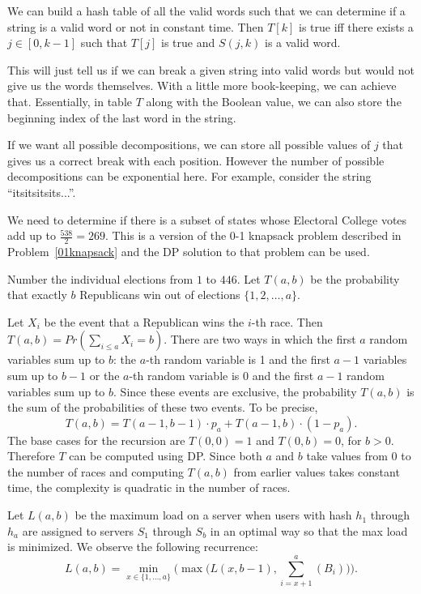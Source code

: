 We can build a hash table of all the valid words such that we can
determine if a string is a valid word or not in constant time.
Then $T[k] $ is true iff there exists a $j \in [0,k-1] $ such that
$T[j]$ is true and $S(j,k)$ is a valid word.

This will just tell us if we can break a given string into valid words
but would not give us the words themselves. With a little more
book-keeping, we can achieve that. Essentially, in table $T$ along with
the Boolean value, we can also store the beginning index of the last word
in the string.

If we want all possible decompositions, we can store all possible
values of $j$ that gives us a correct break with each
position. However the number of possible decompositions can be exponential
here. For example, consider the string ``itsitsitsits...''.


We need to determine if there is a subset of states whose Electoral College votes add up to $\frac{538}{2} = 269$. This is a version of the 0-1 knapsack problem described in Problem~\ref{01knapsack} and the  DP solution to that problem can be used.


Number the individual elections from $1$ to $446$.
Let $T(a,b)$ be the probability that exactly $b$ Republicans win out of elections $\{1,2,\ldots,a\}$.

Let $X_i$ be the event that a Republican wins the $i$-th race.
Then $T(a,b) = Pr(\sum_{i\leq a} X_i = b)$.  
There are two ways in which the first $a$ random variables sum up to $b$: 
the $a$-th random variable is 1 and the first $a-1$ variables sum up to $b-1$ 
or the $a$-th random variable is 0 and the first $a-1$ random variables sum up to $b$.
Since these events are exclusive, the probability $T(a,b)$ is the sum
of the probabilities of these two events.
To be precise, \[ T(a,b) = T(a-1,b-1) \cdot p_a + T(a-1,b) \cdot (1-p_a) . \]
The base cases for the recursion are $T(0,0) = 1$ and $T(0,b) = 0$, for $b > 0$.
Therefore $T$ can be computed using DP. Since both $a$ and $b$ take 
values from $0$ to the number of races and computing $T(a,b)$ from
earlier values takes constant time, the complexity is quadratic in the number of races.
 
Let $L(a,b)$ be the maximum load on a server when users with hash $h_1$
through $h_a$ are assigned to servers $S_1$ through $S_b$ in an
optimal way so that the max load is minimized. We observe the following recurrence:
\[ L(a,b) = \min_{x\in\{1,\ldots,a\}}\Big(\max\big(L(x,b-1), \sum_{i =
  x+1}^a(B_i)\big)\Big) . \]

